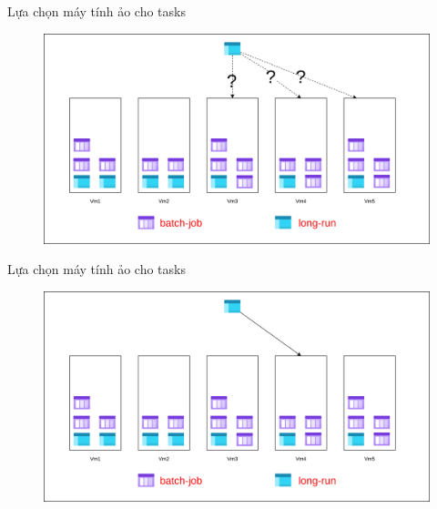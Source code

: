 \documentclass[11pt,xcolor={dvipsnames}, aspectratio=169]{beamer}
\begin{document}
\begin{frame}
{Lựa chọn máy tính ảo cho tasks}
	\begin{figure}
		\vspace{1cm}
		\includegraphics[scale=0.4]{images/balancing_tasks3.png}
	\end{figure}
\end{frame}

\begin{frame}
{Lựa chọn máy tính ảo cho tasks}
	\begin{figure}
		\vspace{1cm}
		\includegraphics[scale=0.4]{images/balancing_tasks4.png}
	\end{figure}
\end{frame}
\end{document}
